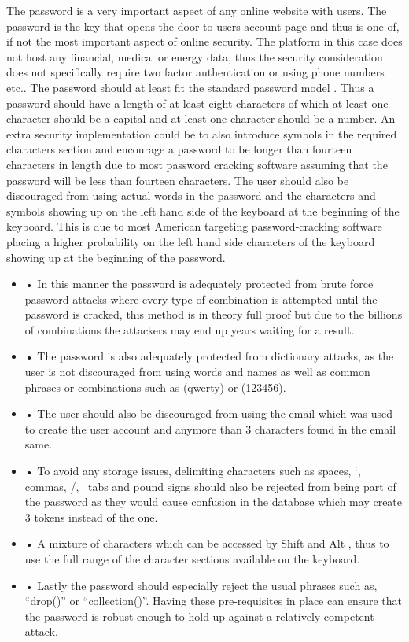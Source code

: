 \documentclass{article}
\begin{document}
The password is a very important aspect of any online website with users. The password is the key that opens the door to users account page and thus is one of, if not the most important aspect of online security. The platform in this case does not host any financial, medical or energy data, thus the security consideration does not specifically require two factor authentication or using phone numbers etc.. The password should at least fit the standard password model \cite{ref:password}. Thus a password should have a length of at least eight characters of which at least one character should be a capital and at least one character should be a number.  An extra security implementation could be to also introduce symbols in the required characters section and encourage a password to be longer than fourteen characters in length \cite{ref:password} due to most password cracking software assuming that the password will be less than fourteen characters. 
The user should also be discouraged from using actual words in the password and the characters and symbols showing up on the left hand side of the keyboard at the beginning of the keyboard. This is due to most American targeting password-cracking software placing a higher probability on the left hand side characters of the keyboard showing up at the beginning of the password.
\begin{itemize} 
\item•	In this manner the password is adequately protected from brute force password attacks where every type of combination is attempted until the password is cracked, this method is in theory full proof but due to the billions of combinations the attackers may end up years waiting for a result.
\item•	 The password is also adequately protected from dictionary attacks, as the user is not discouraged from using words and names as well as common phrases or combinations such as (qwerty) or (123456).
\item•	The user should also be discouraged from using the email which was used to create the user account and anymore than 3 characters found in the email same.
\item•	To avoid any storage issues, delimiting characters such as spaces, ‘, commas, /, \, tabs and pound signs should also be rejected from being part of the password as they would cause confusion in the database which may create 3 tokens instead of the one.
\item•	A mixture of characters which can be accessed by Shift and Alt , thus to use the full range of the  character sections available on the keyboard.
\item•	Lastly the password should especially reject the usual phrases such as, “drop()” or “collection()”.
Having these pre-requisites in place can ensure that the password is robust enough to hold up against a relatively competent attack.
\end{itemize}
\end{document}
